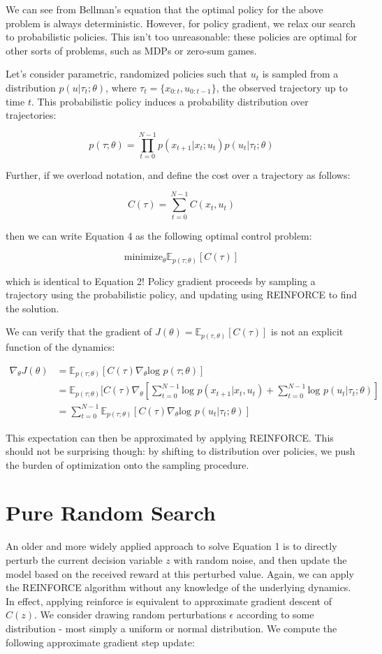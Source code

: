 \documentclass{article}[12pt]
\def\E{\mathbb{E}}
\def \E{\mathbb E}
\begin{document}
We can see from Bellman's equation that the optimal policy for the above problem is always deterministic. However, for policy gradient, we relax our search to probabilistic policies. This isn't too unreasonable: these policies are optimal for other sorts of problems, such as MDPs or zero-sum games.

Let's consider parametric, randomized policies such that $u_t$ is sampled from a distribution $p(u|\tau_t;\theta)$, where $\tau_t = \{x_{0:t},u_{0:t-1}\}$, the observed trajectory up to time $t$. This probabilistic policy induces a probability distribution over trajectories:

$$p(\tau;\theta) = \prod_{t=0}^{N-1}p(x_{t+1}|x_t;u_t)p(u_t|\tau_t;\theta)$$

Further, if we overload notation, and define the cost over a trajectory as follows:

$$C(\tau) = \sum_{t=0}^{N-1}C(x_t,u_t)$$

then we can write Equation 4 as the following optimal control problem:

\begin{equation}
\text{minimize}_\theta \E_{p(\tau;\theta)}[C(\tau)]
\end{equation}

which is identical to Equation 2! Policy gradient proceeds by sampling a trajectory using the probabilistic policy, and updating using REINFORCE to find the solution.

We can verify that the gradient of $J(\theta) = \E_{p(\tau,\theta)}[C(\tau)]$ is not an explicit function of the dynamics:

\begin{align*}
\nabla_\theta J(\theta) &= \E_{p(\tau;\theta)}[C(\tau)\nabla_\theta\text{log }p(\tau;\theta)]\\
&= \E_{p(\tau;\theta)}[C(\tau)\nabla_\theta\left[\sum_{t=0}^{N-1}\text{log }p(x_{t+1}|x_t,u_t)+\sum_{t=0}^{N-1}\text{log }p(u_t|\tau_t;\theta)\right]\\
&=\sum_{t=0}^{N-1}\E_{p(\tau;\theta)}[C(\tau)\nabla_\theta\text{log }p(u_t|\tau_t;\theta)]
\end{align*}

This expectation can then be approximated by applying REINFORCE. This should not be surprising though: by shifting to distribution over policies, we push the burden of optimization onto the sampling procedure.

\section{Pure Random Search}
An older and more widely applied approach to solve Equation 1 is to directly perturb the current decision variable $z$ with random noise, and then update the model based on the received reward at this perturbed value. Again, we can apply the REINFORCE algorithm without any knowledge of the underlying dynamics. In effect, applying reinforce is equivalent to approximate gradient descent of $C(z)$. We consider drawing random perturbations $\epsilon$ according to some distribution - most simply a uniform or normal distribution. We compute the following approximate gradient step update:
\end{document}
